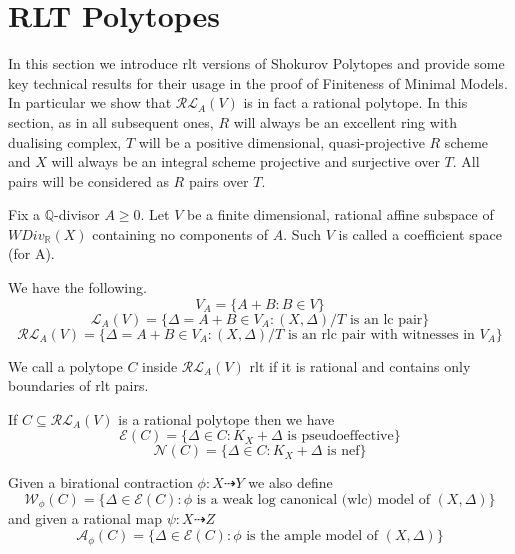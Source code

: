 \documentclass[a4paper,12pt]{amsart}
\begin{document}
	\section{RLT Polytopes}
	
	In this section we introduce rlt versions of Shokurov Polytopes and provide some key technical results for their usage in the proof of Finiteness of Minimal Models. In particular we show that $\mathcal{RL}_{A}(V)$ is in fact a rational polytope. In this section, as in all subsequent ones, $R$ will always be an excellent ring with dualising complex, $T$ will be a positive dimensional, quasi-projective $R$ scheme and $X$ will always be an integral scheme projective and surjective over $T$. All pairs will be considered as $R$ pairs over $T$.
	
	\begin{definition}
		
		Fix a $\mathbb{Q}$-divisor $A\geq 0$. Let $V$ be a finite dimensional, rational affine subspace of $WDiv_{\mathbb{R}}(X)$ containing no components of $A$. Such $V$ is called a coefficient space (for A).
		
		We have the following.
		\[V_{A}= \{A+B: B \in V\}\]
		\[\mathcal{L}_{A}(V)=\{\Delta=A+B \in V_{A}: (X,\Delta)/T \text{ is an lc pair}\}\]
		\[\mathcal{RL}_{A}(V)=\{\Delta=A+B \in V_{A}: (X,\Delta)/T \text{ is an rlc pair with witnesses in } V_{A}\}\]
		
		We call a polytope $C$ inside $\mathcal{RL}_{A}(V)$ rlt if it is rational and contains only boundaries of rlt pairs.
		
		If $C \subseteq \mathcal{RL}_{A}(V)$ is a rational polytope then we have
		\[\mathcal{E}(C)=\{\Delta \in C: K_{X}+\Delta \text{ is pseudoeffective}\}\]
		\[\mathcal{N}(C)=\{\Delta \in C: K_{X}+\Delta \text{ is nef}\}\]
		
		Given a birational contraction $\phi:X \dashrightarrow Y$ we also define
		\[\mathcal{W}_{\phi}(C)=\{\Delta \in \mathcal{E}(C): \phi \text{ is a weak log canonical (wlc) model of } (X,\Delta)\}\]
		and given a rational map $\psi:X \dashrightarrow Z$
		\[\mathcal{A}_{\phi}(C)=\{\Delta \in \mathcal{E}(C): \phi \text{ is the ample model of } (X,\Delta)\}\]
	\end{definition}
	
\end{document}
